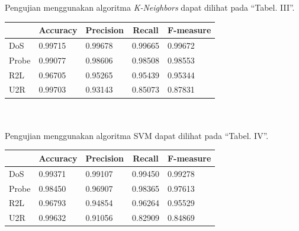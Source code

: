 \documentclass[conference]{IEEEtran}
\begin{document}
\noindent Pengujian menggunakan algoritma \emph{K-Neighbors} dapat dilihat pada ``Tabel. III''.\vspace{6pt}

\begin{minipage}{\linewidth}
\begin{center}
\begin{tabular}{|l|l|l|l|l|}
\hline
\multicolumn{1}{|c|}{\textbf{}}&\multicolumn{1}{|c|}{\textbf{Accuracy}}&\multicolumn{1}{|c|}{\textbf{Precision}}&\multicolumn{1}{|c|}{\textbf{Recall}}&\multicolumn{1}{|c|}{\textbf{F-measure}} \\
\hline
DoS & 0.99715 & 0.99678 & 0.99665 & 0.99672\\
\hline
Probe & 0.99077 & 0.98606 & 0.98508 & 0.98553\\
\hline
R2L & 0.96705 & 0.95265 & 0.95439 & 0.95344\\
\hline
U2R & 0.99703 & 0.93143 & 0.85073 & 0.87831\\
\hline
\end{tabular}
\label{tab3}
\end{center}
\end{minipage}\\ \\

\noindent Pengujian menggunakan algoritma SVM dapat dilihat pada ``Tabel. IV''.

\begin{minipage}{\linewidth}
\begin{center}
\begin{tabular}{|l|l|l|l|l|}
\hline
\multicolumn{1}{|c|}{\textbf{}}&\multicolumn{1}{|c|}{\textbf{Accuracy}}&\multicolumn{1}{|c|}{\textbf{Precision}}&\multicolumn{1}{|c|}{\textbf{Recall}}&\multicolumn{1}{|c|}{\textbf{F-measure}} \\
\hline
DoS & 0.99371 & 0.99107 & 0.99450 & 0.99278\\
\hline
Probe & 0.98450 & 0.96907 & 0.98365 & 0.97613\\
\hline
R2L & 0.96793 & 0.94854 & 0.96264 & 0.95529\\
\hline
U2R & 0.99632 & 0.91056 & 0.82909 & 0.84869\\
\hline
\end{tabular}
\label{tab4}
\end{center}
\end{minipage}\\ \\
\end{document}
